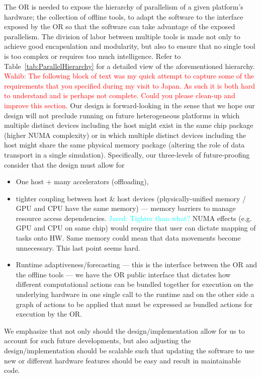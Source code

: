 \documentclass{article}
\newcommand{\Jared}[1]          {\textcolor{cyan}{Jared: #1}}
\newcommand{\Wahib}[1]          {\textcolor{red}{Wahib: #1}}
\newcommand{\shortOR}   {OR\xspace}
\newcommand{\OR}        {\shortOR}
\begin{document}
The \OR is needed to expose the hierarchy of parallelism of a
given platform's hardware; the collection of offline tools, to adapt the
software to the interface exposed by the \OR so that the software can take advantage of the exposed
parallelism.  The division of labor between multiple tools is made not only to
achieve good encapsulation and modularity, but also to ensure that no single
tool is too complex or requires too much intelligence.  Refer to
Table~\ref{tab:ParallelHierarchy} for a detailed view of the aforementioned
hierarchy.\\

\Wahib{The following block of text was my quick attempt to capture some of the
requirements that you specified during my visit to Japan.  As such it is both
hard to understand and is perhaps not complete.  Could you please clean-up and
improve this section.}
Our design is forward-looking in the sense that we hope our
design will not preclude running on future heterogeneous platforms in which
multiple distinct devices including the host might exist in the same chip
package (higher NUMA complexity) or in which multiple distinct devices including
the host might share the same physical memory package (altering the role of data
transport in a single simulation).  Specifically, our three-levels of
future-proofing consider that the design must allow for
\begin{itemize}
\item{One host + many accelerators (offloading),}
\item{tighter coupling between host \& host devices
(physically-unified memory / GPU and CPU have the same memory) --- memory
barriers to manage resource access dependencies.  \Jared{Tighter than what?} NUMA effects (e.g. GPU and CPU
on same chip) would require that user can dictate mapping of tasks onto HW.
Same memory could mean that data movements become unnecessary.  This last point
seems hard.}
\item{Runtime adaptiveness/forecasting --- this is the interface between the
\OR and the offline tools --- we have the \OR public
interface that dictates how different computational actions can be bundled
together for execution on the underlying hardware in one single call to the
runtime and on the other side a graph of actions to be applied that
must be expressed as bundled actions for execution by the \OR.}
\end{itemize}

We emphasize that not only should the design/implementation allow for us to
account for such future developments, but also adjusting the
design/implementation should be scalable such that updating the software to use
new or different hardware features should be easy and result in maintainable
code.
\end{document}
